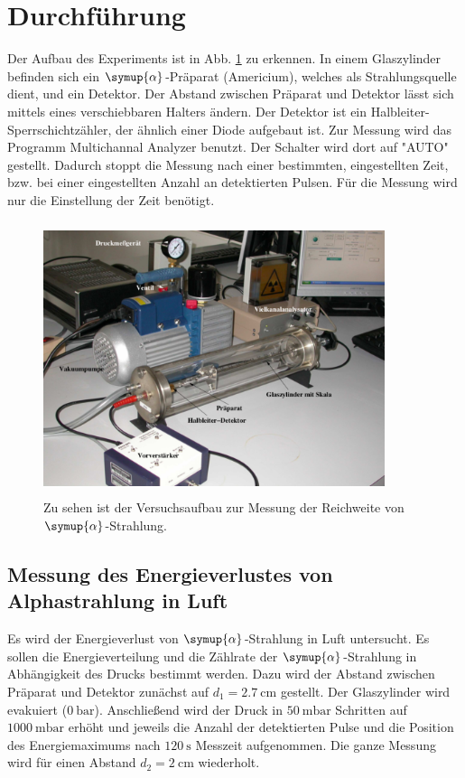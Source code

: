 \section{Durchführung}
\label{sec:Durchführung}

Der Aufbau des Experiments ist in Abb. \ref{fig:aufbau} zu erkennen. In einem Glaszylinder befinden sich ein $\symup{\alpha}$-Präparat (Americium), welches als Strahlungsquelle dient, und ein Detektor. Der Abstand zwischen Präparat und Detektor lässt sich mittels eines verschiebbaren Halters ändern. Der Detektor ist ein Halbleiter-Sperrschichtzähler, der ähnlich einer Diode aufgebaut ist. 
Zur Messung wird das Programm Multichannal Analyzer benutzt.
Der Schalter wird dort auf "AUTO" gestellt. Dadurch stoppt die Messung nach einer bestimmten, eingestellten Zeit, bzw. bei einer eingestellten Anzahl an detektierten Pulsen.
Für die Messung wird nur die Einstellung der Zeit benötigt.

\begin{figure}
    \centering
    \includegraphics[width=10cm, height=8cm]{build/aufbau.png}
    \caption{Zu sehen ist der Versuchsaufbau zur Messung der Reichweite von $\symup{\alpha}$-Strahlung. \cite{V701}}
    \label{fig:aufbau}
\end{figure}

\subsection{Messung des Energieverlustes von Alphastrahlung in Luft}
Es wird der Energieverlust von $\symup{\alpha}$-Strahlung in Luft untersucht.
Es sollen die Energieverteilung und die Zählrate der $\symup{\alpha}$-Strahlung in Abhängigkeit des Drucks bestimmt werden.
\newline
Dazu wird der Abstand zwischen Präparat und Detektor zunächst auf $d_1 = \SI{2.7}{\centi\meter}$ gestellt. Der Glaszylinder wird evakuiert ($\SI{0}{\bar}$). Anschließend wird der Druck in $\SI{50}{\milli\bar}$ Schritten auf $\SI{1000}{\milli\bar}$ erhöht und jeweils die Anzahl der detektierten Pulse und die Position des Energiemaximums nach $\SI{120}{\second}$ Messzeit aufgenommen.
\newline
Die ganze Messung wird für einen Abstand $d_2 = \SI{2}{\centi\meter}$ wiederholt.


